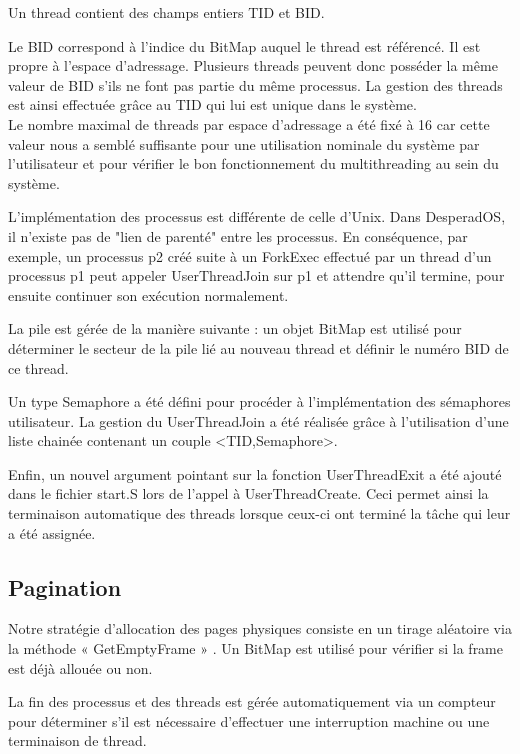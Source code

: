 \documentclass[12pt]{report}
\begin{document}
Un thread contient des champs entiers TID et BID.

Le BID correspond à l'indice du BitMap auquel le thread est référencé. Il est propre à l'espace d'adressage. Plusieurs threads peuvent donc posséder la même valeur de BID s'ils ne font pas partie du même processus. La gestion des threads est ainsi effectuée grâce au TID qui lui est unique dans le système. \\

Le nombre maximal de threads par espace d'adressage a été fixé à 16 car cette valeur nous a semblé suffisante pour une utilisation nominale du système par l'utilisateur et pour vérifier le bon fonctionnement du multithreading au sein du système.

\bigskip

L'implémentation des processus est différente de celle d'Unix. Dans DesperadOS, il n'existe pas de "lien de parenté" entre les processus. En conséquence, par exemple, un processus p2 créé suite à un ForkExec effectué par un thread d'un processus p1 peut appeler UserThreadJoin sur p1 et attendre qu'il termine, pour ensuite continuer son exécution normalement.
\bigskip

La pile est gérée de la manière suivante :
un objet BitMap est utilisé pour déterminer le secteur de la pile lié au nouveau thread et définir le numéro BID de ce thread.

Un type Semaphore a été défini pour procéder à l'implémentation des sémaphores utilisateur. 
La gestion du UserThreadJoin a été réalisée grâce à l'utilisation d'une liste chainée contenant un couple <TID,Semaphore>.

Enfin, un nouvel argument pointant sur la fonction UserThreadExit a été ajouté dans le fichier start.S lors de l'appel à UserThreadCreate. Ceci permet ainsi la terminaison automatique des threads lorsque ceux-ci ont terminé la tâche qui leur a été assignée.



\subsection{Pagination}


Notre stratégie d’allocation des pages physiques consiste en un tirage aléatoire via la méthode « GetEmptyFrame » . Un BitMap est utilisé pour vérifier si la frame est déjà allouée ou non.
\bigskip

La fin des processus et des threads est gérée automatiquement via un compteur pour déterminer s'il est nécessaire d'effectuer une interruption machine ou une terminaison de thread.
\bigskip
\end{document}
